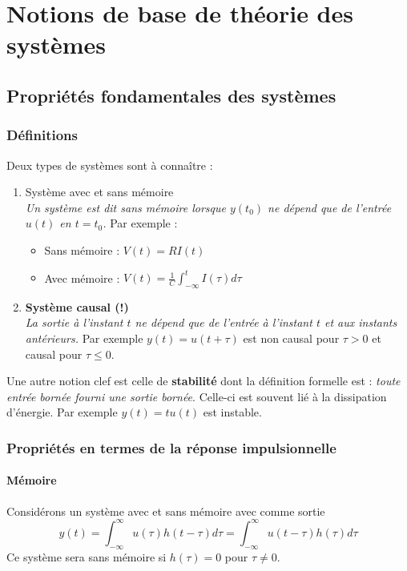 \chapter{Notions de base de théorie des systèmes}

\section{Propriétés fondamentales des systèmes}
\subsection{Définitions}
Deux types de systèmes sont à connaître :
\begin{enumerate}
	\item Système avec et sans mémoire\\
	      \textit{Un système est dit sans mémoire lorsque $y(t_0)$ ne dépend que de l'entrée 
	      	$u(t)$ en $t=t_0$.} Par exemple :
	      \begin{itemize}
	      	\item Sans mémoire : $V(t) = RI(t)$
	      	\item Avec mémoire : $V(t) = \frac{1}{C}\int_{-\infty}^t I(\tau)d\tau$
	      \end{itemize}
	\item \textbf{Système causal (!)}\\
	      \textit{La sortie à l'instant $t$ ne dépend que de l'entrée à l'instant $t$ et aux 
	      	instants antérieurs.} Par exemple $y(t) = u(t+\tau)$ est non causal pour $
	      \tau > 0$ et causal pour $\tau\leq0$.
\end{enumerate}
	
Une autre notion clef est celle de \textbf{stabilité} dont la définition formelle 
est : \textit{toute entrée bornée fourni une sortie bornée}. Celle-ci est souvent
lié à la dissipation d'énergie. Par exemple $y(t) = tu(t)$ est instable.




\subsection{Propriétés en termes de la réponse impulsionnelle}
\subsubsection{Mémoire}
Considérons un système avec et sans mémoire avec comme sortie 
\begin{equation}
	y(t) = \int_{-\infty}^\infty u(\tau)h(t-\tau)d\tau = \int_{-\infty}^\infty u(t-\tau)
	h(\tau)d\tau
\end{equation}
Ce système sera sans mémoire si $h(\tau) = 0$ pour $\tau \neq 0$.\\
	
